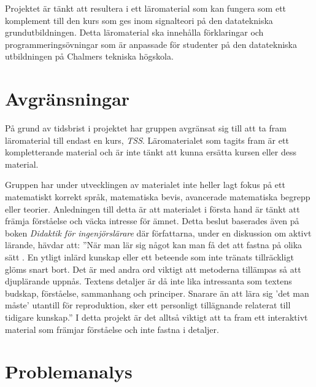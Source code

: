 \documentclass[12pt,a4paper,twoside,openright]{article}
\begin{document}
Projektet är tänkt att resultera i ett läromaterial som kan fungera som ett
komplement till den kurs som ges inom signalteori på den datatekniska
grund\-utbildningen. Detta läromaterial ska innehålla förklaringar och
programmeringsövningar som är anpassade för studenter på den datatekniska
utbildningen på Chalmers tekniska högskola.

\section{Avgränsningar}

På grund av tidsbrist i projektet har gruppen avgränsat sig till att ta fram
läromaterial till endast en kurs, \textit{TSS}. Läromaterialet som tagits fram är ett
kompletterande material och är inte tänkt att kunna ersätta kursen eller
dess material.

Gruppen har under utvecklingen av materialet inte heller lagt fokus på
ett matematiskt korrekt språk, matematiska bevis, avancerade matematiska
begrepp eller teorier. Anledningen till detta är att materialet i
första hand är tänkt att främja förståelse och väcka intresse för
ämnet. Detta beslut baserades även på boken \textit{Didaktik för
 ingenjörslärare} där författarna, under en diskussion om aktivt
lärande, hävdar att: ”När man lär sig något kan man få det att fastna
på olika sätt \cite{didaktik_for_ingenjorslarare}. En ytligt inlärd kunskap eller ett beteende som inte
tränats tillräckligt glöms snart bort. Det är med andra ord viktigt
att metoderna tillämpas så att djuplärande uppnås. Textens detaljer är
då inte lika intressanta som textens budskap, förståelse, sammanhang
och principer. Snarare än att lära sig 'det man måste' utantill för
reproduktion, sker ett personligt tillägnande relaterat till tidigare
kunskap.” I detta projekt är det alltså viktigt att ta fram ett
interaktivt material som främjar förståelse och inte fastna i
detaljer.

\section{Problemanalys}
\end{document}
